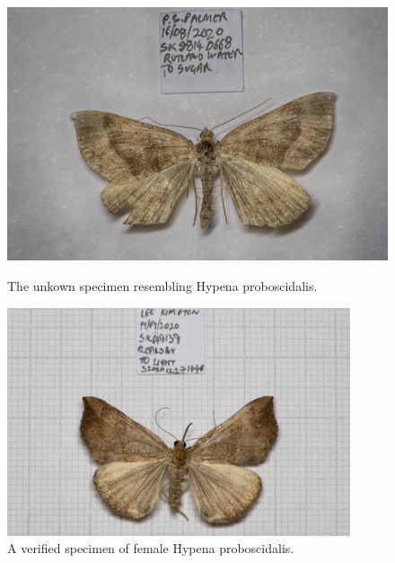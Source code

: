 \documentclass[]{article}
\begin{document}
\begin{figure}
	\centering
	\begin{minipage}{0.45\textwidth}
		\centering
	\includegraphics[width=0.9\linewidth]{202009131026PJP-1}
	\caption{The unkown specimen resembling Hypena proboscidalis.}
	\label{fig:202009131026pjp-1}
	\end{minipage}\hfill
	\begin{minipage}{0.45\textwidth}
		\centering
		\includegraphics[width=0.9\textwidth]{S202012271446-1} %
		\caption{A verified specimen of female Hypena proboscidalis.}
		\label{fig:S202012271446-1}
	\end{minipage}
\end{figure}
\end{document}
